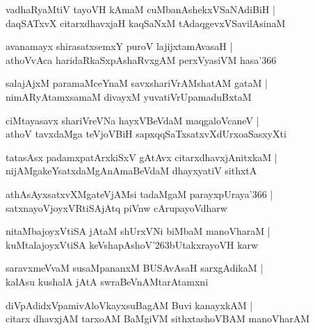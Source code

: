 \documentclass[twoside,12pt,openright]{book}
\def\S{\char'263}
\newcounter{shloka}[chapter]
\begin{document}
\begin{shloka}%
vadhaRyaMtiV tayoVH kAmaM cuMbanAshekxVSaNAdiBiH |\\
daqSATxvX citarxdhavxjaH kaqSaNxM tAdaqgevxVSavilAsinaM 
\end{shloka}

\begin{shloka}%
avanamayx shirasatxsemxY puroV lajijxtamAvasaH |\\
athoVvAca haridaRkaSxpAshaRvxgAM perxVyasiVM hasa\char'366
\end{shloka}

\begin{shloka}%
salajAjxM paramaMceYnaM savxshariVrAMshatAM gataM |\\
nimARyAtamxsamaM divayxM yuvatiVrUpamaduBxtaM 
\end{shloka}

\begin{shloka}%
ciMtayasavx shariVreVNa hayxVBeVdaM maqgaloVcaneV |\\
athoV tavxdaMga teVjoVBiH sapxqqSaTxsatxvXdUrxoaSasxyXti 
\end{shloka}

\begin{shloka}%
tatasAsx padamxpatArxkiSxV gAtAvx citarxdhavxjAnitxkaM |\\
nijAMgakeYsatxdaMgAnAmaBeVdaM dhayxyatiV sithxtA
\end{shloka}

\begin{shloka}%
athAsAyxsatxvXMgateVjAMsi tadaMgaM parayxpUraya\char'366 |\\
satxnayoVjoyxVRtiSAjAtq piVnw cArupayoVdharw
\end{shloka}

\begin{shloka}%
nitaMbajoyxVtiSA jAtaM shUrxVNi biMbaM manoVharaM |\\
kuMtalajoyxVtiSA keVshapAshoV\S bUtakxrayoVH karw 
\end{shloka}

\begin{shloka}%
saravxmeVvaM susaMpananxM BUSAvAsaH sarxgAdikaM |\\
kalAsu kushalA jAtA swraBeVnAMtarAtamxni
\end{shloka}

\begin{shloka}%
diVpAdidxVpamivAloVkayxsuBagAM Buvi kanayxkAM |\\
citarx dhavxjAM tarxoAM BaMgiVM sithxtashoVBAM manoVharAM 
\end{shloka}
\end{document}
